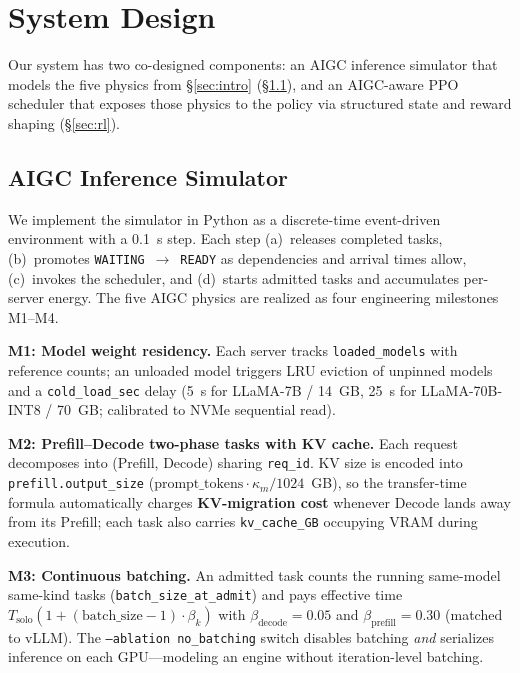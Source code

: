 \section{System Design}
\label{sec:system}

Our system has two co-designed components: an AIGC inference
simulator that models the five physics from \S\ref{sec:intro}
(\S\ref{sec:simulator}), and an AIGC-aware PPO scheduler that
exposes those physics to the policy via structured state and
reward shaping (\S\ref{sec:rl}).

\subsection{AIGC Inference Simulator}
\label{sec:simulator}

We implement the simulator in Python as a discrete-time
event-driven environment with a 0.1~s step. Each step
(a)~releases completed tasks, (b)~promotes
\texttt{WAITING}~$\to$~\texttt{READY} as dependencies and
arrival times allow, (c)~invokes the scheduler, and
(d)~starts admitted tasks and accumulates per-server energy.
The five AIGC physics are realized as four engineering
milestones M1--M4.

\textbf{M1: Model weight residency.} Each server tracks
\texttt{loaded\_models} with reference counts; an unloaded
model triggers LRU eviction of unpinned models and a
\texttt{cold\_load\_sec} delay (5~s for LLaMA-7B / 14~GB,
25~s for LLaMA-70B-INT8 / 70~GB; calibrated to NVMe
sequential read).

\textbf{M2: Prefill--Decode two-phase tasks with KV cache.}
Each request decomposes into (Prefill, Decode) sharing
\texttt{req\_id}. KV size is encoded into
\texttt{prefill.output\_size}
($\text{prompt\_tokens}\cdot\kappa_m/1024$~GB), so the
transfer-time formula automatically charges
\textbf{KV-migration cost} whenever Decode lands away from its
Prefill; each task also carries \texttt{kv\_cache\_GB}
occupying VRAM during execution.

\textbf{M3: Continuous batching.} An admitted task counts the
running same-model same-kind tasks
(\texttt{batch\_size\_at\_admit}) and pays effective time
$T_{\text{solo}}(1+(\text{batch\_size}-1)\cdot\beta_k)$ with
$\beta_{\text{decode}}{=}0.05$ and
$\beta_{\text{prefill}}{=}0.30$ (matched to vLLM). The
\texttt{--ablation no\_batching} switch disables batching
\emph{and} serializes inference on each GPU---modeling an
engine without iteration-level batching.

